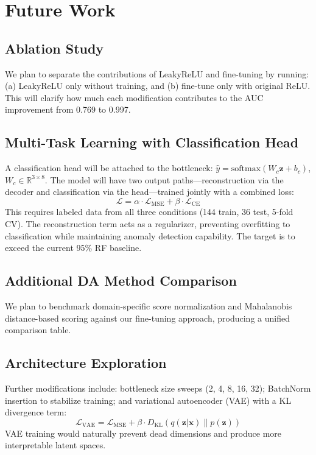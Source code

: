 \documentclass[sigconf]{acmart}
\begin{document}
\section{Future Work}

\subsection{Ablation Study}

We plan to separate the contributions of LeakyReLU and fine-tuning by running: (a) LeakyReLU only without training, and (b) fine-tune only with original ReLU. This will clarify how much each modification contributes to the AUC improvement from 0.769 to 0.997.

\subsection{Multi-Task Learning with Classification Head}

A classification head will be attached to the bottleneck: $\hat{y} = \text{softmax}(W_c \mathbf{z} + b_c)$, $W_c \in \mathbb{R}^{3 \times 8}$. The model will have two output paths---reconstruction via the decoder and classification via the head---trained jointly with a combined loss:
\begin{equation}
\mathcal{L} = \alpha \cdot \mathcal{L}_{\text{MSE}} + \beta \cdot \mathcal{L}_{\text{CE}}
\end{equation}
This requires labeled data from all three conditions (144 train, 36 test, 5-fold CV). The reconstruction term acts as a regularizer, preventing overfitting to classification while maintaining anomaly detection capability. The target is to exceed the current 95\% RF baseline.

\subsection{Additional DA Method Comparison}

We plan to benchmark domain-specific score normalization and Mahalanobis distance-based scoring against our fine-tuning approach, producing a unified comparison table.

\subsection{Architecture Exploration}

Further modifications include: bottleneck size sweeps (2, 4, 8, 16, 32); BatchNorm insertion to stabilize training; and variational autoencoder (VAE) with a KL divergence term:
\begin{equation}
\mathcal{L}_{\text{VAE}} = \mathcal{L}_{\text{MSE}} + \beta \cdot D_{\text{KL}}(q(\mathbf{z}|\mathbf{x}) \| p(\mathbf{z}))
\end{equation}
VAE training would naturally prevent dead dimensions and produce more interpretable latent spaces.
\end{document}
